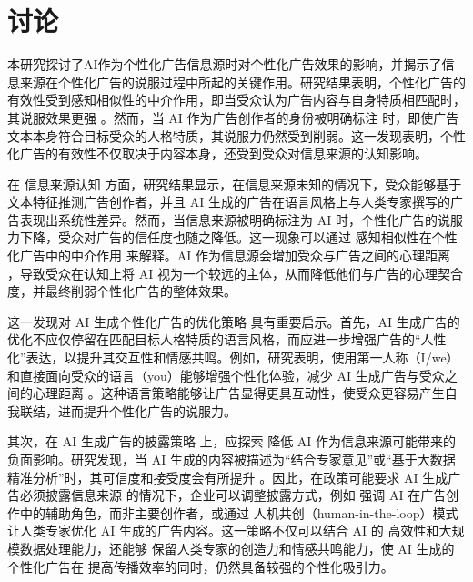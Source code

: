 \section{讨论}

本研究探讨了AI作为个性化广告信息源时对个性化广告效果的影响，并揭示了信息来源在个性化广告的说服过程中所起的关键作用。研究结果表明，个性化广告的有效性受到感知相似性的中介作用，即当受众认为广告内容与自身特质相匹配时，其说服效果更强 \citep{li2016does, teeny2021review}。然而，当 AI 作为广告创作者的身份被明确标注 时，即使广告文本本身符合目标受众的人格特质，其说服力仍然受到削弱。这一发现表明，个性化广告的有效性不仅取决于内容本身，还受到受众对信息来源的认知影响。

在 信息来源认知 方面，研究结果显示，在信息来源未知的情况下，受众能够基于文本特征推测广告创作者，并且 AI 生成的广告在语言风格上与人类专家撰写的广告表现出系统性差异。然而，当信息来源被明确标注为 AI 时，个性化广告的说服力下降，受众对广告的信任度也随之降低。这一现象可以通过 感知相似性在个性化广告中的中介作用 来解释。AI 作为信息源会增加受众与广告之间的心理距离 \citep{kim2020artificial, ahn2021ai}，导致受众在认知上将 AI 视为一个较远的主体，从而降低他们与广告的心理契合度，并最终削弱个性化广告的整体效果。

这一发现对 AI 生成个性化广告的优化策略 具有重要启示。首先，AI 生成广告的优化不应仅停留在匹配目标人格特质的语言风格，而应进一步增强广告的“人性化”表达，以提升其交互性和情感共鸣。例如，研究表明，使用第一人称（I/we）和直接面向受众的语言（you）能够增强个性化体验，减少 AI 生成广告与受众之间的心理距离 \citep{markowitz2020communicating}。这种语言策略能够让广告显得更具互动性，使受众更容易产生自我联结，进而提升个性化广告的说服力。

其次，在 AI 生成广告的披露策略 上，应探索 降低 AI 作为信息来源可能带来的负面影响。研究发现，当 AI 生成的内容被描述为“结合专家意见”或“基于大数据精准分析”时，其可信度和接受度会有所提升 \citep{puerta2022human}。因此，在政策可能要求 AI 生成广告必须披露信息来源 的情况下，企业可以调整披露方式，例如 强调 AI 在广告创作中的辅助角色，而非主要创作者，或通过 人机共创（human-in-the-loop）模式 让人类专家优化 AI 生成的广告内容。这一策略不仅可以结合 AI 的 高效性和大规模数据处理能力，还能够 保留人类专家的创造力和情感共鸣能力，使 AI 生成的个性化广告在 提高传播效率的同时，仍然具备较强的个性化吸引力。
